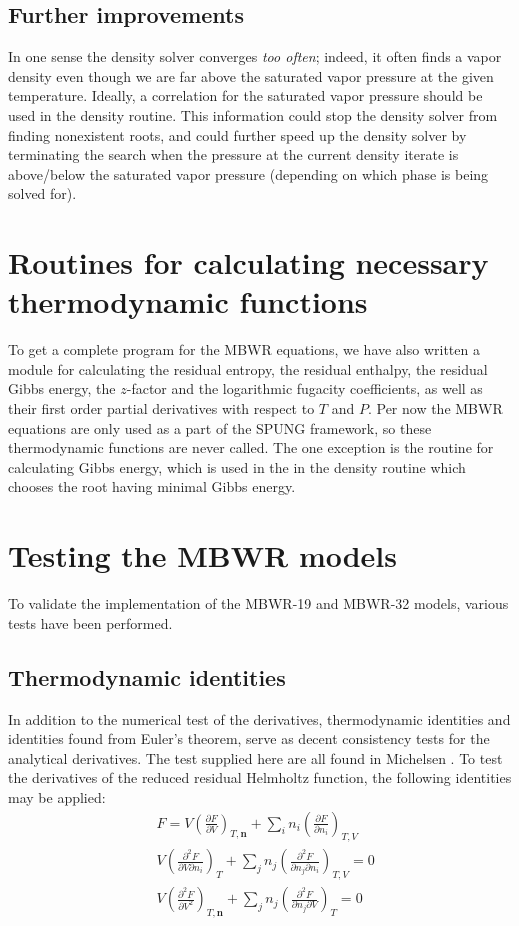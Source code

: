 \documentclass[internal,english]{sintefmemo2012}
\newcommand*{\pder}[2]{\left(\frac{\partial #1}{\partial #2}\right)}
\newcommand*{\pdder}[2]{\left(\frac{\partial^2 #1}{\partial #2^2}\right)}
\newcommand*{\pdcross}[3]{\left(\frac{\partial^2 #1}{\partial #2 \partial #3}\right)}
\numberwithin{equation}{section}
\begin{document}
\subsection{Further improvements}
In one sense the density solver converges \textit{too often}; indeed,
it often finds a vapor density even though we are far above the saturated vapor
pressure at the given temperature. Ideally, a correlation for the saturated
vapor pressure should be used in the density routine. This information
could stop the density solver from finding nonexistent roots, and
could further speed up the density solver by terminating the search
when the pressure at the current density iterate is above/below the
saturated vapor pressure (depending on which phase is being solved
for).

\section{Routines for calculating necessary thermodynamic functions}
To get a complete program for the MBWR equations, we have also written
a module for calculating the residual entropy, the residual enthalpy,
the residual Gibbs energy, the $z$-factor and the logarithmic fugacity
coefficients, as well as their first order partial derivatives with
respect to $T$ and $P$. Per now the MBWR equations are only used as a
part of the SPUNG framework, so these thermodynamic functions are
never called. The one exception is the routine for calculating Gibbs
energy, which is used in the in the density routine which chooses the
root having minimal Gibbs energy.


\section{Testing the MBWR models}
To validate the implementation of the MBWR-19 and MBWR-32 models,
various tests have been performed.

\subsection{Thermodynamic identities}
In addition to the numerical test of the derivatives, thermodynamic
identities and identities found from Euler's theorem, serve as decent
consistency tests for the analytical derivatives. The test supplied
here are all found in Michelsen \cite{Michelsen07}. To test the derivatives of the
reduced residual Helmholtz function, the following identities may be
applied:
\begin{align}
  \label{test:1}
  & F = V \pder{F}{V}_{T,\textbf{n}} + \sum_i n_i \pder{F}{n_i}_{T,V} \\
  \label{test:2}
  & V \pdcross{F}{V}{n_i}_T + \sum_j n_j \pdcross{F}{n_j}{n_i}_{T,V} = 0 \\
  \label{test:3}
  & V \pdder{F}{V}_{T,\textbf{n}} + \sum_j n_j \pdcross{F}{n_j}{V}_T =
  0
\end{align}
\end{document}
